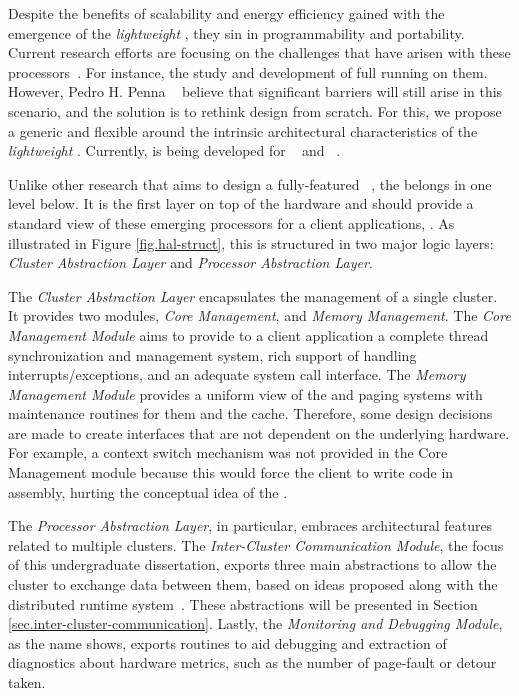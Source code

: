 	Despite the benefits of scalability and energy efficiency gained with the
	emergence of the \textit{lightweight \manycores}, they sin in programmability
	and portability.
	Current research efforts are focusing on the challenges that have arisen with
	these processors~\cite{christgau2017, gamell2012, serres2011}.
	For instance, the study and development of full \oses running on them.
	However, Pedro H. Penna \etal~\cite{penna:compas19, penna2019} believe that significant barriers will still
	arise in this scenario, and the solution is to rethink \os design from scratch.
	For this, we propose a generic and flexible \hal around the intrinsic
	architectural characteristics of the \textit{lightweight \manycores}.
	Currently, \hal is being developed for \mppa~\cite{DeDinechin2013-1} and
	\optimsoc~\cite{Wallentowitz2013}.

	Unlike other research that aims to design a fully-featured \os~\cite{Baumann2009,kluge2014,nightingale2009,rhoden2011},
	the \hal belongs in one level below.
	It is the first layer on top of the hardware and should provide a standard
	view of these emerging processors for a client applications, \eg \os.
	As illustrated in Figure \ref{fig.hal-struct}, this \hal is structured in
	two major logic layers: \textit{Cluster Abstraction Layer} and \textit{Processor Abstraction Layer}.

	The \textit{Cluster Abstraction Layer} encapsulates the management of a single cluster.
	It provides two modules, \textit{Core Management}, and \textit{Memory Management}.
	The \textit{Core Management Module} aims to provide to a client application a complete
	thread synchronization and management system, rich support of handling
	interrupts/exceptions, and an adequate system call interface.
	The \textit{Memory Management Module} provides a uniform view of the \tlbs
	and paging systems with maintenance routines for them and the cache.
	Therefore, some design decisions are made to create interfaces that are not
	dependent on the underlying hardware.
	For example, a context switch mechanism was not provided in the
	Core Management module because this would force the client \os
	to write code in assembly, hurting the conceptual idea of the \hal.

	The \textit{Processor Abstraction Layer}, in particular, embraces
	architectural features related to multiple clusters.
	The \textit{Inter-Cluster Communication Module}, the focus of
	this undergraduate dissertation, exports three main abstractions to allow the
	cluster to exchange data between them, based on ideas proposed along with the
	\nodeos distributed runtime system~\cite{DeDinechin2013-1}.
	These abstractions will be presented in Section \ref{sec.inter-cluster-communication}.
	Lastly, the \textit{Monitoring and Debugging Module}, as the
	name shows, exports routines to aid debugging and extraction
	of diagnostics about hardware metrics, such as the number of
	page-fault or detour taken.

